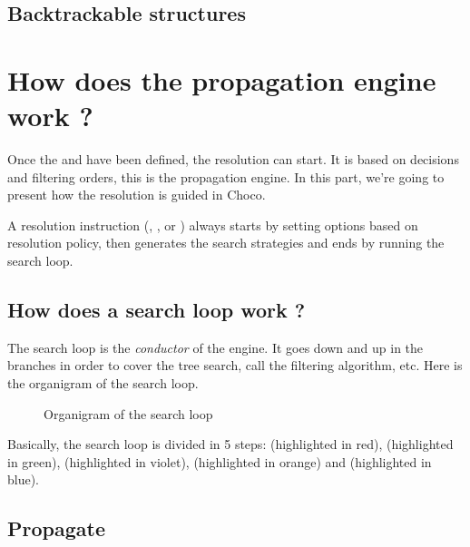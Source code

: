 \subsection{Backtrackable structures}\label{advanced:backtrackablestructures}\hypertarget{advanced:backtrackablestructures}{}
\section{How does the propagation engine work ?}

Once the  and  have been defined, the resolution can start. It is based on decisions and filtering orders, this is the propagation engine. In this part, we're going to present how the resolution is guided in Choco. 

A resolution instruction (, ,  or ) always starts by setting options based on resolution policy, then generates the search strategies and ends by running the search loop. 

\subsection{How does a search loop work ?}\label{advanced:howdoesasearchloopwork}\hypertarget{advanced:howdoesasearchloopwork}{}
The search loop is the \textit{conductor} of the engine. It goes down and up in the branches in order to cover the tree search, call the filtering algorithm, etc.
Here is the organigram of the search loop. 


\begin{figure}[!htp]
	\centerline{}
	\caption[]{Organigram of the search loop}\label{fig:media/searchloop.pdf}
\end{figure}

Basically, the search loop is divided in 5 steps:  (highlighted in red),  (highlighted in green),  (highlighted in violet),  (highlighted in orange) and  (highlighted in blue). 

\subsection{Propagate}\label{advanced:propagate}\hypertarget{advanced:propagate}{}


